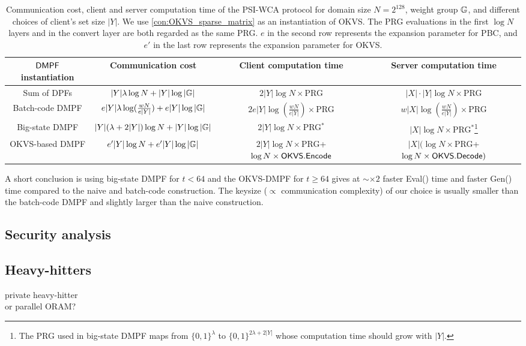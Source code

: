 \begin{table*}
  \renewcommand\arraystretch{1.5}
  \caption{Communication cost, client and server computation time of the PSI-WCA protocol for domain size $N = 2^{128}$, weight group $\mathbb{G}$, and  different choices of client's set size $|Y|$. We use \cref{con:OKVS_sparse_matrix} as an instantiation of OKVS. The PRG evaluations in the first $\log N$ layers and in the convert layer are both regarded as the same PRG. $e$ in the second row represents the expansion parameter for PBC, and $e'$ in the last row represents the expansion parameter for OKVS. }
\label{tab:PSI_plug_in_formula}
  \begin{tabular}{cccc}
          \toprule
    ${\sf DMPF}$ instantiation & Communication cost & Client computation time & Server computation time \\
          \midrule

          Sum of DPFs & $|Y|\lambda\log N+|Y|\log|\mathbb{G}|$ & $2|Y|\log N\times $PRG & $|X|\cdot |Y|\log N\times $PRG\\

          Batch-code DMPF & $e|Y|\lambda\log(\frac{wN}{e|Y|})+e|Y|\log|\mathbb{G}|$ & $2e|Y|\log(\frac{wN}{e|Y|})\times$PRG & $w|X|\log(\frac{wN}{e|Y|})\times$PRG\\

          Big-state DMPF & $|Y|(\lambda+2|Y|)\log N+|Y|\log|\mathbb{G}|$ & $2|Y|\log N\times $PRG$^*$ & $|X|\log N \times$PRG$^*$\footnote{The PRG used in big-state DMPF maps from $\{0,1\}^\lambda$ to $\{0,1\}^{2\lambda+2|Y|}$ whose computation time should grow with $|Y|$. }\\

          OKVS-based DMPF& $e'|Y|\log N +e'|Y|\log|\mathbb{G}|$ & $2|Y|\log N\times$PRG+$\log N\times {\sf OKVS}.{\sf Encode}$ & $|X|(\log N\times$PRG+$\log N\times {\sf OKVS}.{\sf Decode})$\\
          \bottomrule
  \end{tabular}
\end{table*}



A short conclusion is using big-state DMPF for $t<64$ and the OKVS-DMPF for $t\ge 64$ gives at $\sim \times 2$ faster Eval() time and faster Gen() time compared to the naive and batch-code construction. The keysize ($\propto$ communication complexity) of our choice is usually smaller than the batch-code DMPF and slightly larger than the naive construction. 
\subsection{Security analysis}
\subsection{Heavy-hitters}
private heavy-hitter\\
or parallel ORAM?